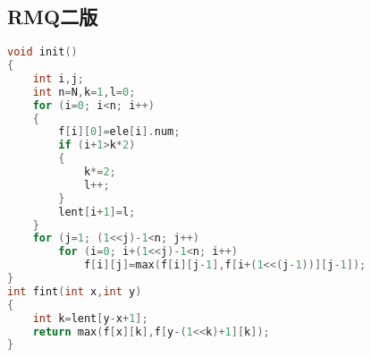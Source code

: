 \subsection{RMQ二版}
	\begin{lstlisting}[language=c++]
void init()
{
	int i,j;
	int n=N,k=1,l=0;
	for (i=0; i<n; i++)
	{
		f[i][0]=ele[i].num;
		if (i+1>k*2)
		{
			k*=2;
			l++;
		}
		lent[i+1]=l;
	}
	for (j=1; (1<<j)-1<n; j++)
		for (i=0; i+(1<<j)-1<n; i++)
			f[i][j]=max(f[i][j-1],f[i+(1<<(j-1))][j-1]);
}
int fint(int x,int y)
{
	int k=lent[y-x+1];
	return max(f[x][k],f[y-(1<<k)+1][k]);
}
	\end{lstlisting}
